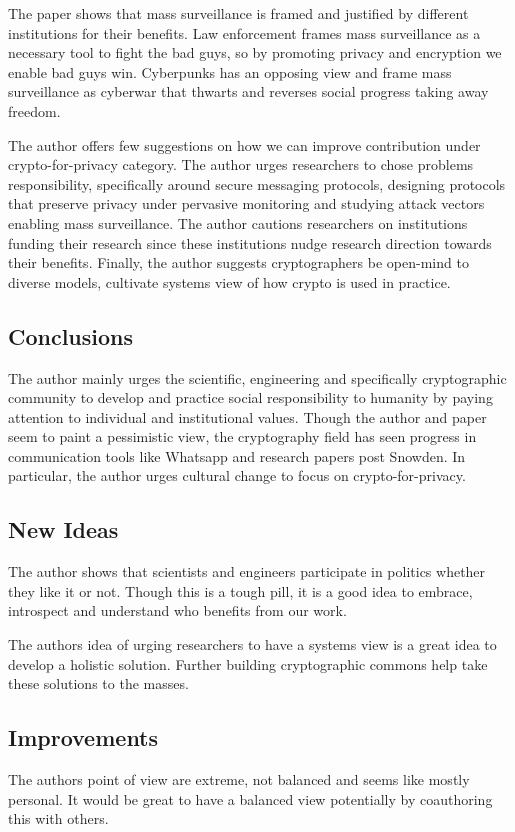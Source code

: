 \documentclass[12pt]{article}
\begin{document}
    The paper shows that mass surveillance is framed and justified by different institutions for their benefits. Law enforcement frames mass surveillance as a necessary tool to fight the bad guys, so by promoting privacy and encryption we enable bad guys win. Cyberpunks has an opposing view and frame mass surveillance as cyberwar that thwarts and reverses social progress taking away freedom.

    The author offers few suggestions on how we can improve contribution under crypto-for-privacy category. The author urges researchers to chose problems responsibility, specifically around secure messaging protocols, designing protocols that preserve privacy under pervasive monitoring and studying attack vectors enabling mass surveillance. The author cautions researchers on institutions funding their research since these institutions nudge research direction towards their benefits. Finally, the author suggests cryptographers be open-mind to diverse models,  cultivate systems view of how crypto is used in practice.
    
    \subsection*{Conclusions}
    The author mainly urges the scientific, engineering and specifically cryptographic community to develop and practice social responsibility to humanity by paying attention to individual and institutional values. Though the author and paper seem to paint a pessimistic view, the cryptography field has seen progress in communication tools like Whatsapp and research papers post Snowden. In particular, the author urges cultural change to focus on crypto-for-privacy.

    \subsection*{New Ideas}
    The author shows that scientists and engineers participate in politics whether they like it or not. Though this is a tough pill, it is a good idea to embrace, introspect and understand who benefits from our work.

    The authors idea of urging researchers to have a systems view is a great idea to develop a holistic solution. Further building cryptographic commons help take these solutions to the masses.

    \subsection*{Improvements}
    The authors point of view are extreme, not balanced and seems like mostly personal. It would be great to have a balanced view potentially by coauthoring this with others.
\end{document}
